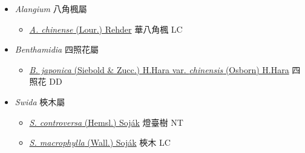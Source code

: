 
  \begin{itemize}
 \item[] \textit{Alangium} 八角楓屬
                                
  \begin{itemize}
        \item[] \href{http://www.theplantlist.org/tpl1.1/search?q=Alangium+chinense}{\textit{A. chinense} (Lour.) Rehder}   華八角楓   LC
  \end{itemize}
 \item[] \textit{Benthamidia} 四照花屬
                                
  \begin{itemize}
        \item[] \href{http://www.theplantlist.org/tpl1.1/search?q=Benthamidia+japonica+var.+chinensis}{\textit{B. japonica} (Siebold \& Zucc.) H.Hara var. \textit{chinensis} (Osborn) H.Hara}   四照花   DD
  \end{itemize}
 \item[] \textit{Swida} 梜木屬
                                
  \begin{itemize}
        \item[] \href{http://www.theplantlist.org/tpl1.1/search?q=Swida+controversa}{\textit{S. controversa} (Hemsl.) Soják}   燈臺樹   NT
        \item[] \href{http://www.theplantlist.org/tpl1.1/search?q=Swida+macrophylla}{\textit{S. macrophylla} (Wall.) Soják}   梜木   LC
  \end{itemize}
  \end{itemize}
